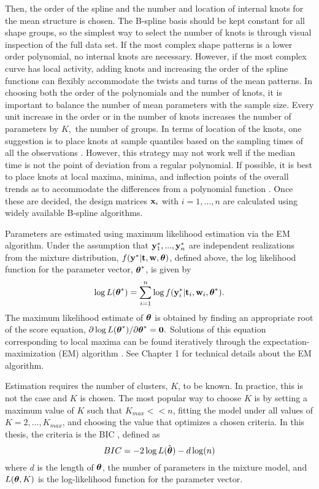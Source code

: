 Then, the order of the spline and the number and location of internal knots for the mean structure is chosen. The B-spline basis should be kept constant for all shape groups, so the simplest way to select the number of knots is through visual inspection of the full data set. If the most complex shape patterns is a lower order polynomial, no internal knots are necessary. However, if the most complex curve has local activity, adding knots and increasing the order of the spline functions can flexibly accommodate the twists and turns of the mean patterns. In choosing both the order of the polynomials and the number of knots, it is important to balance the number of mean parameters with the sample size. Every unit increase in the order or in the number of knots increases the number of parameters by $K,$ the number of groups. In terms of location of the knots, one suggestion is to place knots at sample quantiles based on the sampling times of all the observations \cite{ruppert2002}. However, this strategy may not work well if the median time is not the point of deviation from a regular polynomial. If possible, it is best to place knots at local maxima, minima, and inflection points of the overall trends as to accommodate the differences from a polynomial function \cite{eubank1999}.  Once these are decided, the design matrices $\mathbf x_{i}$ with $i=1,...,n$ are calculated using widely available B-spline algorithms. 

Parameters are estimated using maximum likelihood estimation via the EM algorithm. Under the assumption that $\mathbf y^{*}_{1},...,\mathbf y^{*}_{n}$ are independent realizations from the mixture distribution, $f(\mathbf y^{*} | \mathbf t, \mathbf w, \boldsymbol\theta)$, defined above, the log likelihood function for the parameter vector, $\boldsymbol \theta^{*}$, is given by
$$\log L(\boldsymbol\theta^{*})=\sum^{n}_{i=1}\log f(\mathbf y^{*}_{i}|\mathbf t_{i},\mathbf w_{i},\boldsymbol \theta^{*}).$$
The maximum likelihood estimate of $\boldsymbol\theta$ is obtained by finding an appropriate root of the score equation, $\partial \log L(\boldsymbol\theta^{*})/\partial \boldsymbol\theta^{*}=\mathbf 0.$ Solutions of this equation corresponding to local maxima can be found iteratively through the expectation-maximization (EM) algorithm \cite{dempster1977}. See Chapter 1 for technical details about the EM algorithm.

Estimation requires the number of clusters, $K$, to be known. In practice, this is not the case and $K$ is chosen. The most popular way to choose $K$ is by setting a maximum value of $K$ such that $K_{max}<<n$, fitting the model under all values of $K=2,...,K_{max}$, and choosing the value that optimizes a chosen criteria. In this thesis, the criteria is the BIC \cite{schwarz1978}, defined as
$$BIC = -2\log L(\hat{\boldsymbol\theta})- d\log(n)$$
where $d$ is the length of $\boldsymbol\theta$, the number of parameters in the mixture model, and $L(\boldsymbol\theta,K)$ is the log-likelihood function for the parameter vector. 

